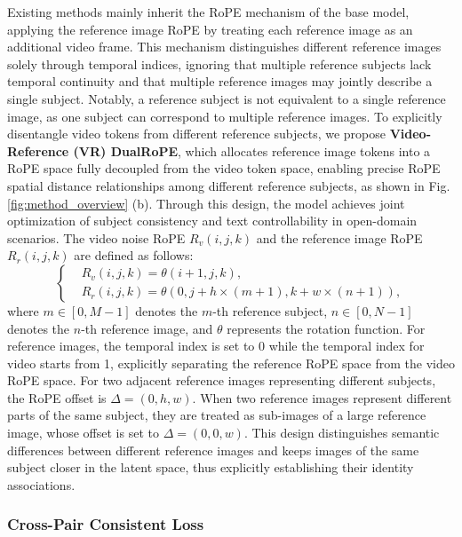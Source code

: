 \documentclass{llmxive}
\begin{document}
Existing methods mainly inherit the RoPE mechanism of the base model, applying the reference image RoPE by treating each reference image as an additional video frame. This mechanism distinguishes different reference images solely through temporal indices, ignoring that multiple reference subjects lack temporal continuity and that multiple reference images may jointly describe a single subject. Notably, a reference subject is not equivalent to a single reference image, as one subject can correspond to multiple reference images. To explicitly disentangle video tokens from different reference subjects, we propose \textbf{Video-Reference (VR) DualRoPE}, which allocates reference image tokens into a RoPE space fully decoupled from the video token space, enabling precise RoPE spatial distance relationships among different reference subjects, as shown in Fig. \ref{fig:method_overview} (b). Through this design, the model achieves joint optimization of subject consistency and text controllability in open-domain scenarios. The video noise RoPE $R_v(i,j,k)$ and the reference image RoPE $R_r(i,j,k)$ are defined as follows:
\begin{equation}
\left\{
\begin{aligned}
& R_v(i,j,k) = \theta (i+1,j,k)  , \\
&R_r(i,j,k) = \theta(0,j+h\times(m+1),k+w\times(n+1)),
\end{aligned}
\right.
\end{equation}
where $m \in [0, M-1] $ denotes the $m$-th reference subject, $n \in [0, N-1]$ denotes the $n$-th reference image, and $\theta$ represents the rotation function. For reference images, the temporal index is set to 0 while the temporal index for video starts from 1, explicitly separating the reference RoPE space from the video RoPE space. For two adjacent reference images representing different subjects, the RoPE offset is $\Delta=(0,h,w)$. When two reference images represent different parts of the same subject, they are treated as sub-images of a large reference image, whose offset is set to $\Delta=(0,0,w)$. This design distinguishes semantic differences between different reference images and keeps images of the same subject closer in the latent space, thus explicitly establishing their identity associations.






\subsubsection{ Cross-Pair Consistent Loss}
\end{document}
